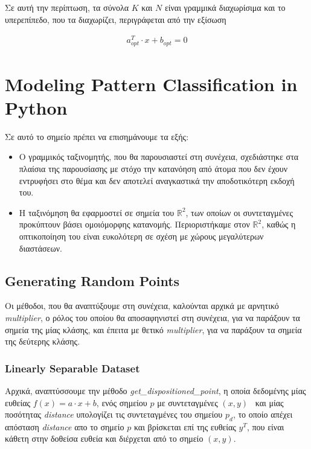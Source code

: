 \documentclass[12pt]{article}
\newcommand{\R}{\mathbb{R}}
\newcommand{\centered}[1]{\begin{align*}#1\end{align*}}
\begin{document}
Σε αυτή την περίπτωση, τα σύνολα \( K \) και \( N \) είναι γραμμικά διαχωρίσιμα και
το υπερεπίπεδο, που τα διαχωρίζει, περιγράφεται από την εξίσωση

\centered{a^{T}_{opt} \cdot x + b_{opt} = 0}

\pagebreak

\section{Modeling Pattern Classification in Python}

Σε αυτό το σημείο πρέπει να επισημάνουμε τα εξής: \\

\begin{itemize}
    \item Ο γραμμικός ταξινομητής, που θα παρουσιαστεί στη συνέχεια,
    σχεδιάστηκε στα πλαίσια της παρουσίασης με στόχο την κατανόηση
    από άτομα που δεν έχουν εντρυφήσει στο θέμα και δεν αποτελεί αναγκαστικά
    την αποδοτικότερη εκδοχή του. \\

    \item Η ταξινόμηση θα εφαρμοστεί σε σημεία του \( \R^2 \),
    των οποίων οι συντεταγμένες προκύπτουν βάσει ομοιόμορφης κατανομής.
    Περιοριστήκαμε στον \( \R^2 \), καθώς η οπτικοποίηση του είναι ευκολότερη
    σε σχέση με χώρους μεγαλύτερων διαστάσεων. \\
\end{itemize}

\subsection{Generating Random Points}

Οι μέθοδοι, που θα αναπτύξουμε στη συνέχεια, καλούνται αρχικά με αρνητικό \textit{multiplier},
ο ρόλος του οποίου θα αποσαφηνιστεί στη συνέχεια,
για να παράξουν τα σημεία της μίας κλάσης, και έπειτα με θετικό \textit{multiplier},
για να παράξουν τα σημεία της δεύτερης κλάσης. \\

\subsubsection{Linearly Separable Dataset}

Αρχικά, αναπτύσσουμε την μέθοδο \textit{get\_dispositioned\_point},
η οποία δεδομένης μίας ευθείας \( f(x) = a \cdot x + b \),
ενός σημείου \( p \) με συντεταγμένες \( (x, y) \) \ και
μίας ποσότητας \textit{distance} υπολογίζει τις συντεταγμένες του σημείου \( p_d \),
το οποίο απέχει απόσταση \textit{distance} απο το σημείο \( p \) και
βρίσκεται επί της ευθείας \( y^T \), που είναι κάθετη στην δοθείσα ευθεία και
διέρχεται από το σημείο \( (x, y) \). \\
\end{document}
